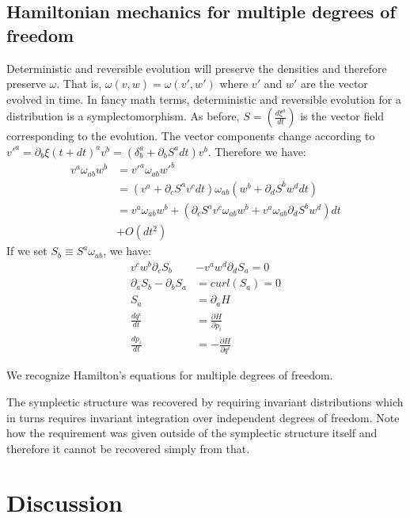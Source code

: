 \documentclass[11pt]{article}
\begin{document}
\subsection*{Hamiltonian mechanics for multiple degrees of freedom}

Deterministic and reversible evolution will preserve the densities and therefore preserve $\omega$. That is, $\omega(v, w) = \omega(v',w')$ where $v'$ and $w'$ are the vector evolved in time. In fancy math terms, deterministic and reversible evolution for a distribution is a symplectomorphism. As before, $S = \left(\frac{d\xi^a}{dt}\right)$ is the vector field corresponding to the evolution. The vector components change according to $v'^a = \partial_b \xi(t+dt)^a v^b = (\delta^a_b + \partial_b S^a dt) v^b$. Therefore we have:
\begin{align*}
v^{a} \omega_{ab} w^{b} &= v'^{a} \omega_{ab} w'^{b}  \\
&= (v^{a} + \partial_{c} S^{a} v^{c} dt) \omega_{ab} ( w^{b} + \partial_{d} S^{b} w^{d} dt) \\
&= v^{a} \omega_{ab} w^{b} + (\partial_{c} S^{a} v^{c} \omega_{ab} w^{b} + v^{a} \omega_{ab} \partial_{d} S^{b} w^{d}) dt \\ &+ O(dt^2)
\end{align*}
If we set $S_{b} \equiv S^{a} \omega_{ab}$, we have:
\begin{equation}
\begin{aligned}
v^{c} w^{b} \partial_{c} S_{b} &- v^{a} w^{d} \partial_{d} S_{a} = 0\\
\partial_{a} S_{b} - \partial_{b} S_{a} &= curl(S_{a}) = 0 \\
S_{a} &= \partial_{a}H \\
\frac{dq^i}{dt} &= \frac{\partial H}{\partial p_i}  \\
\frac{dp_i}{dt} &= - \frac{\partial H}{\partial q^i}
\end{aligned}
\end{equation}

We recognize Hamilton's equations for multiple degrees of freedom.

The symplectic structure was recovered by requiring invariant distributions which in turns requires invariant integration over independent degrees of freedom. Note how the requirement was given outside of the symplectic structure itself and therefore it cannot be recovered simply from that.

\section{Discussion}
\end{document}
